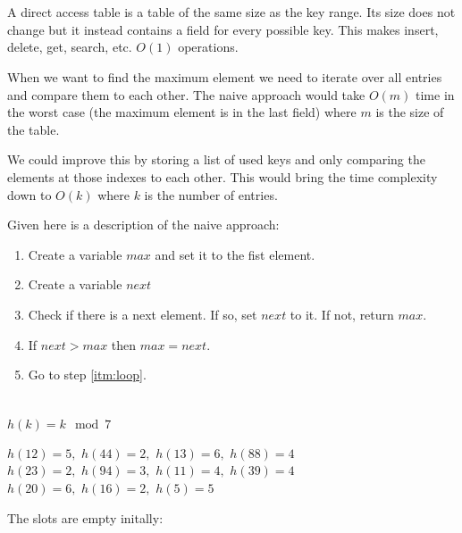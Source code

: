 \documentclass[12pt]{article}
\begin{document}
\section{} %
A direct access table is a table of the same size as the key range. Its size does not change but it instead contains a field for every possible key. This makes insert, delete, get, search, etc. $O(1)$ operations.

When we want to find the maximum element we need to iterate over all entries and compare them to each other. The naive approach would take $O(m)$ time in the worst case (the maximum element is in the last field) where $m$ is the size of the table.

We could improve this by storing a list of used keys and only comparing the elements at those indexes to each other. This would bring the time complexity down to $O(k)$ where $k$ is the number of entries.

Given here is a description of the naive approach:

\begin{enumerate}
	\item Create a variable $max$ and set it to the fist element.
	\item Create a variable $next$
	\item \label{itm:loop} Check if there is a next element. If so, set $next$ to it. If not, return $max$.
	\item If $next > max$ then $max = next$.
	\item Go to step \ref{itm:loop}.
\end{enumerate}

\section{} %
$h(k) = k \mod 7$

$h(12) = 5,$ $h(44) = 2,$ $h(13) = 6,$ $h(88) = 4$\\
$h(23) = 2,$ $h(94) = 3,$ $h(11) = 4,$ $h(39) = 4$\\
$h(20) = 6,$ $h(16) = 2,$ $h(5) = 5$

The slots are empty initally:
\end{document}
